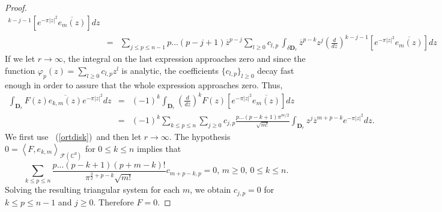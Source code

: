 \documentclass[12pt]{amsart}
\theoremstyle{plain}
\numberwithin{equation}{section}
\begin{document}
\begin{proof}
\begin{eqnarray*}
^{k-j-1}\left[ e^{-\pi \left\vert z\right\vert ^{2}}\overline{e_{m}(z)}%
\right] dz \\
&=&\sum_{j\leq p\leq n-1}p...(p-j+1)\overline{z}^{p-j}\sum_{l\geq
0}c_{l,p}\,\int_{\delta \mathbf{D}_{r}}\overline{z}^{p-k}z^{j}\left( \frac{d%
}{d\overline{z}}\right) ^{k-j-1}\left[ e^{-\pi \left\vert z\right\vert ^{2}}%
\overline{e_{m}(z)}\right] dz
\end{eqnarray*}%
If we let $r\rightarrow \infty $, the integral on the last expression
approaches zero and since the function  $\varphi _{p}(z)=\sum_{l\geq
0}c_{l,p}z^{l}$ is analytic, the coefficients $\{c_{l,p}\}_{l\geq 0}$ decay
fast enough in order to assure that the whole expression approaches zero.
Thus,%
\begin{eqnarray*}
\int_{\mathbf{D}_{r}}F(z)\overline{e_{k,m}(z)}e^{-\pi \left\vert
z\right\vert ^{2}}dz &=&(-1)^{k}\int_{\mathbf{D}_{r}}\left( \frac{d}{d%
\overline{z}}\right) ^{k}F(z)\left[ e^{-\pi \left\vert z\right\vert ^{2}}%
\overline{e_{m}(z)}\right] dz \\
&=&(-1)^{k}\sum_{k\leq p\leq n}\sum_{j\geq 0}c_{j,p}\frac{p...(p-k+1)\pi
^{m/2}}{\sqrt{m!}}\int_{\mathbf{D}_{r}}z^{j}\overline{z}^{m+p-k}e^{-\pi
\left\vert z\right\vert ^{2}}dz.
\end{eqnarray*}%
We first use \ (\ref{ortdisk})\ and then let $r\rightarrow \infty $. The
hypothesis $0=\left\langle F,e_{k,m}\right\rangle _{\mathcal{F}(%
\mathbb{C}
^{d})}$ for $0\leq k\leq n$ implies that 
\begin{equation*}
\sum_{k\leq p\leq n}\frac{p...(p-k+1)(p+m-k)!}{\pi ^{\frac{3}{2}+p-k}\sqrt{m!%
}}c_{m+p-k,p}=0\text{, \ \ }m\geq 0\text{, }0\leq k\leq n\text{.}
\end{equation*}
Solving the resulting triangular system for each $m$, we obtain $c_{j,p}=0$
for $k\leq p\leq n-1$ and $j\geq 0$. Therefore $F=0$.


\end{proof}
\end{document}

